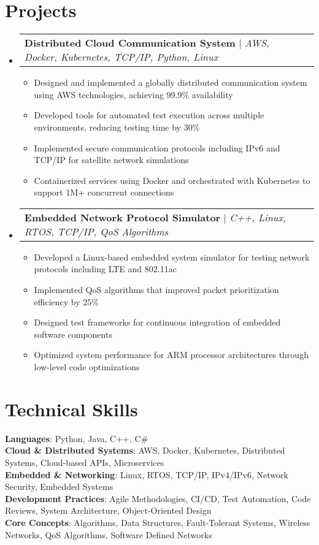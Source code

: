 \documentclass{article}
\makeatletter
\newcommand{\resumeItem}[1]{
  \item\small{
    {#1 \vspace{-2pt}}
  }
}
\newcommand{\resumeProjectHeading}[2]{
    \item
    \begin{tabular*}{0.97\textwidth}{l@{\extracolsep{\fill}}r}
      \small#1 & #2 \\
    \end{tabular*}\vspace{-7pt}
}
\newcommand{\resumeSubHeadingListStart}{\begin{itemize}[leftmargin=0.15in, label={}]}
\newcommand{\resumeSubHeadingListEnd}{\end{itemize}}
\newcommand{\resumeItemListStart}{\begin{itemize}}
\newcommand{\resumeItemListEnd}{\end{itemize}\vspace{-5pt}}
\makeatother
\begin{document}
\section{Projects}
\resumeSubHeadingListStart
\resumeProjectHeading
{\textbf{Distributed Cloud Communication System} $|$ \emph{AWS, Docker, Kubernetes, TCP/IP, Python, Linux}}{}
\resumeItemListStart
\resumeItem{Designed and implemented a globally distributed communication system using AWS technologies, achieving 99.9\% availability}
\resumeItem{Developed tools for automated test execution across multiple environments, reducing testing time by 30\%}
\resumeItem{Implemented secure communication protocols including IPv6 and TCP/IP for satellite network simulations}
\resumeItem{Containerized services using Docker and orchestrated with Kubernetes to support 1M+ concurrent connections}
\resumeItemListEnd
\resumeProjectHeading
{\textbf{Embedded Network Protocol Simulator} $|$ \emph{C++, Linux, RTOS, TCP/IP, QoS Algorithms}}{}
\resumeItemListStart
\resumeItem{Developed a Linux-based embedded system simulator for testing network protocols including LTE and 802.11ac}
\resumeItem{Implemented QoS algorithms that improved packet prioritization efficiency by 25\%}
\resumeItem{Designed test frameworks for continuous integration of embedded software components}
\resumeItem{Optimized system performance for ARM processor architectures through low-level code optimizations}
\resumeItemListEnd
\resumeSubHeadingListEnd




%
\section{Technical Skills}
\begin{itemize}[leftmargin=0.15in, label={}]
\small{\item{
\textbf{Languages}: Python, Java, C++, C\# \\
\textbf{Cloud \& Distributed Systems}: AWS, Docker, Kubernetes, Distributed Systems, Cloud-based APIs, Microservices \\
\textbf{Embedded \& Networking}: Linux, RTOS, TCP/IP, IPv4/IPv6, Network Security, Embedded Systems \\
\textbf{Development Practices}: Agile Methodologies, CI/CD, Test Automation, Code Reviews, System Architecture, Object-Oriented Design \\
\textbf{Core Concepts}: Algorithms, Data Structures, Fault-Tolerant Systems, Wireless Networks, QoS Algorithms, Software Defined Networks
}}
\end{itemize}



\end{document}
